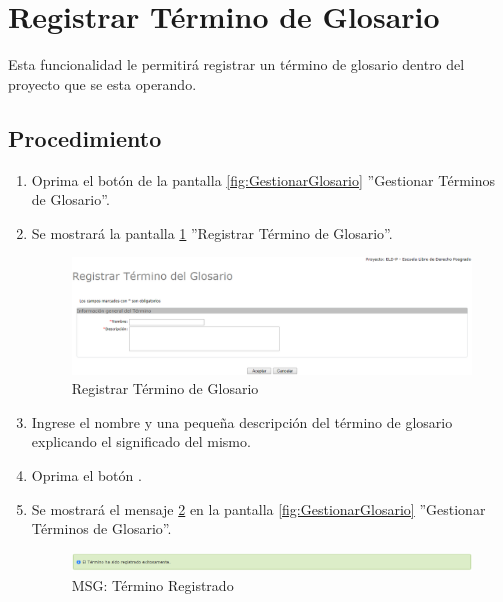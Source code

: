 
\hypertarget{cv:registrarTermino}{\section{Registrar Término de Glosario}} \label{sec:registrarTermino}

	Esta funcionalidad le permitirá registrar un término de glosario dentro del proyecto que se esta operando. 

		\subsection{Procedimiento}

			\begin{enumerate}
	
			\item Oprima el botón \IURegistrar{} de la pantalla \ref{fig:GestionarGlosario} ''Gestionar Términos de Glosario''.
			
			\item Se mostrará la pantalla \ref{fig:registrarTermino} ''Registrar Término de Glosario''.

			\begin{figure}[H]
				\begin{center}
					\includegraphics[scale=0.5]{roles/lider/glosario/pantallas/IU6-1registrarTermino}
					\caption{Registrar Término de Glosario}
					\label{fig:registrarTermino}
				\end{center}
			\end{figure}
		
			\item Ingrese el nombre y una pequeña descripción del término de glosario explicando el significado del mismo.
			
			\item Oprima el botón \IUAceptar.
			
			\item Se mostrará el mensaje \ref{fig:terminoRegistrado} en la pantalla \ref{fig:GestionarGlosario} ''Gestionar Términos de Glosario''.
			
			\begin{figure}[htbp!]
				\begin{center}
					\includegraphics[scale=0.5]{roles/lider/glosario/pantallas/IU6-1MSG1}
					\caption{MSG: Término Registrado}
					\label{fig:terminoRegistrado}
				\end{center}
			\end{figure}
			\end{enumerate}